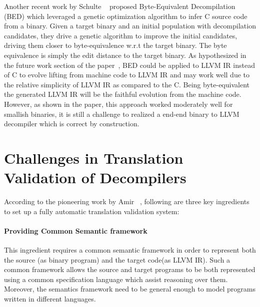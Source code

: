 Another recent work by Schulte \etal~\cite{eschulte2018bed} proposed
Byte-Equivalent Decompilation (BED) which leveraged a genetic optimization
algorithm to infer C source code from a binary. Given a target binary and an
initial population with decompilation candidates, they  drive a genetic
algorithm to improve the initial candidates, driving them closer to
byte-equivalence w.r.t the target binary. The byte equivalence  is simply the
edit distance to the target binary. As hypothesized in the future work section
of the paper~\cite{eschulte2018bed}, BED could be applied to LLVM IR instead of
C to evolve lifting from machine code to LLVM IR and may work well due to the
relative simplicity of LLVM IR as compared to the C. Being byte-equivalent the
generated LLVM IR will be the faithful evolution from the machine code.
However, as shown in the paper, this approach worked moderately well for
smallish binaries, it is still a challenge to realized a end-end binary to LLVM
decompiler which is correct by construction.

\section{Challenges in Translation Validation of Decompilers}\label{sec:challenges}
According to the pioneering work by Amir \etal~\cite{Pnueli:1998}, following
are three key ingredients to set up a fully automatic translation validation
system:

\paragraph{Providing Common Semantic framework} This ingredient requires a
common semantic framework in order to represent both the source (as \ISA binary
    program) and the target code(as LLVM IR). Such a common framework allows
the source and target programs to be both represented using a common
specification language which assist reasoning over them. Moreover, the
semantics framework need to be general enough to model programs written in
different languages.

